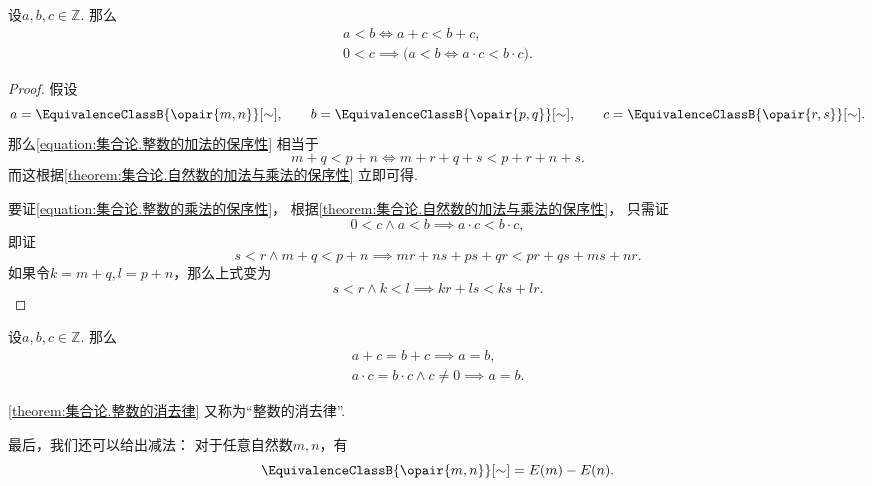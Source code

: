 \begin{theorem}\label{theorem:集合论.整数的加法与乘法的保序性}
设\(a,b,c\in\mathbb{Z}\).
那么\begin{gather}
	a<b \iff a+c<b+c,
	\label{equation:集合论.整数的加法的保序性} \\
	0<c \implies \bigl(
		a<b \iff a \cdot c < b \cdot c
	\bigr).
	\label{equation:集合论.整数的乘法的保序性}
\end{gather}
\begin{proof}
假设\begin{equation*}
	a=\EquivalenceClassB{\opair{m,n}}[\sim], \qquad
	b=\EquivalenceClassB{\opair{p,q}}[\sim], \qquad
	c=\EquivalenceClassB{\opair{r,s}}[\sim].
\end{equation*}
那么\cref{equation:集合论.整数的加法的保序性} 相当于\begin{equation*}
	m+q<p+n \iff m+r+q+s<p+r+n+s.
\end{equation*}
而这根据\cref{theorem:集合论.自然数的加法与乘法的保序性} 立即可得.

要证\cref{equation:集合论.整数的乘法的保序性}，
根据\cref{theorem:集合论.自然数的加法与乘法的保序性}，
只需证\begin{equation*}
	0<c \land a<b \implies a \cdot c < b \cdot c,
\end{equation*}
即证\begin{equation*}
	s<r \land m+q<p+n \implies mr+ns+ps+qr<pr+qs+ms+nr.
\end{equation*}
如果令\(k=m+q, l=p+n\)，那么上式变为\begin{equation*}
	s<r \land k<l \implies kr+ls<ks+lr.
\end{equation*}
\end{proof}
\end{theorem}

\begin{corollary}\label{theorem:集合论.整数的消去律}
设\(a,b,c\in\mathbb{Z}\).
那么\begin{gather*}
	a+c=b+c \implies a=b, \\
	a \cdot c = b \cdot c \land c \neq 0 \implies a=b.
\end{gather*}
\end{corollary}
\cref{theorem:集合论.整数的消去律} 又称为“整数的消去律”.

最后，我们还可以给出减法：%
对于任意自然数\(m,n\)，有\begin{equation*}
	\EquivalenceClassB{\opair{m,n}}[\sim]=E(m)-E(n).
\end{equation*}
